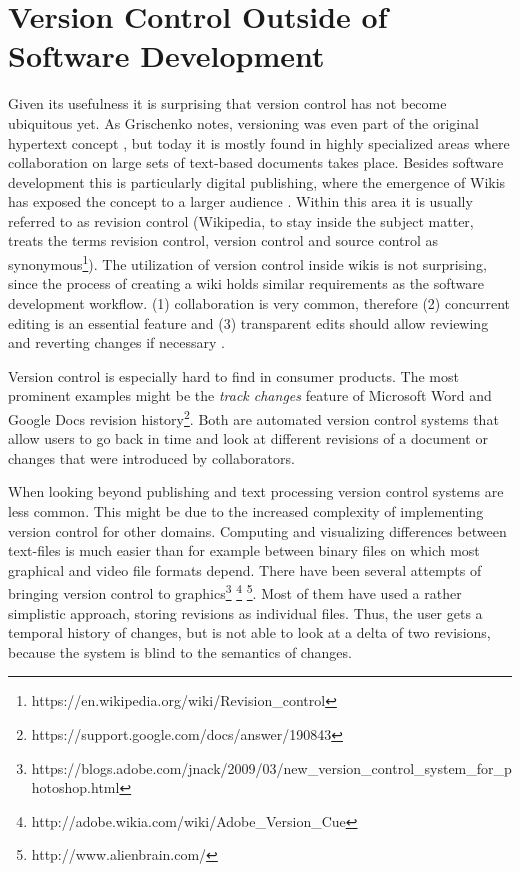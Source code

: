 \section{Version Control Outside of Software Development}
Given its usefulness it is surprising that version control has not become ubiquitous yet. As Grischenko notes, versioning was even part of the original hypertext concept \cite{grishchenko_deep_2010}, but today it is mostly found in highly specialized areas where collaboration on large sets of text-based documents takes place. Besides software development this is particularly digital publishing, where the emergence of Wikis has exposed the concept to a larger audience \cite{priedhorsky_wiki_2011}. Within this area it is usually referred to as revision control (Wikipedia, to stay inside the subject matter, treats the terms revision control, version control and source control as synonymous\footnote{https://en.wikipedia.org/wiki/Revision\_control}). The utilization of version control inside wikis is not surprising, since the process of creating a wiki holds similar requirements as the software development workflow. (1) collaboration is very common, therefore (2) concurrent editing is an essential feature and (3) transparent edits should allow reviewing and reverting changes if necessary \cite{priedhorsky_wiki_2011}. %

Version control is especially hard to find in consumer products. The most prominent examples might be the \textit{track changes} feature of Microsoft Word \cite{thede_track_2009} and Google Docs revision history\footnote{https://support.google.com/docs/answer/190843}. Both are automated version control systems that allow users to go back in time and look at different revisions of a document or changes that were introduced by collaborators.

When looking beyond publishing and text processing version control systems are less common. This might be due to the increased complexity of implementing version control for other domains. Computing and visualizing differences between text-files is much easier than for example between binary files on which most graphical and video file formats depend.  There have been several attempts of bringing version control to graphics\footnote{https://blogs.adobe.com/jnack/2009/03/new\_version\_control\_system\_for\_photoshop.html} \footnote{http://adobe.wikia.com/wiki/Adobe\_Version\_Cue} \footnote{http://www.alienbrain.com/}. Most of them have used a rather simplistic approach, storing revisions as individual files. Thus, the user gets a temporal history of changes, but is not able to look at a delta of two revisions, because the system is blind to the semantics of changes.

